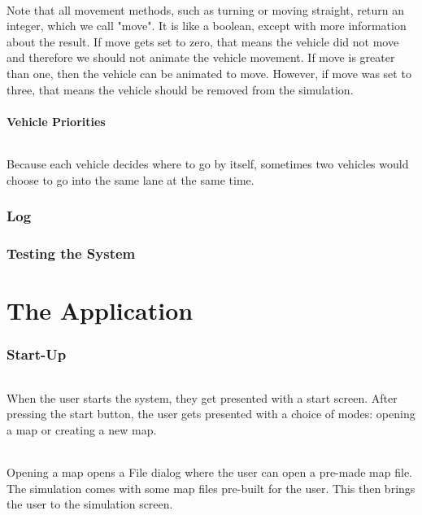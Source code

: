 \documentclass[a4paper,11pt,titlepage]{article}
\begin{document}
\paragraph{}
Note that all movement methods, such as turning or moving straight, return an integer, which we call "move". It is like a boolean, except with more information about the result. If move gets set to zero, that means the vehicle did not move and therefore we should not animate the vehicle movement. If move is greater than one, then the vehicle can be animated to move. However, if move was set to three, that means the vehicle should be removed from the simulation.

\subsection{Vehicle Priorities}
\paragraph{}
Because each vehicle decides where to go by itself, sometimes two vehicles would choose to go into the same lane at the same time. 

\section{Log}

\section{Testing the System}


\part{The Application}
\section{Start-Up}
\paragraph{}
When the user starts the system, they get presented with a start screen. After pressing the start button, the user gets presented with a choice of modes: opening a map or creating a new map.
\paragraph{}
Opening a map opens a File dialog where the user can open a pre-made map file. The simulation comes with some map files pre-built for the user. This then brings the user to the simulation screen.
\end{document}
